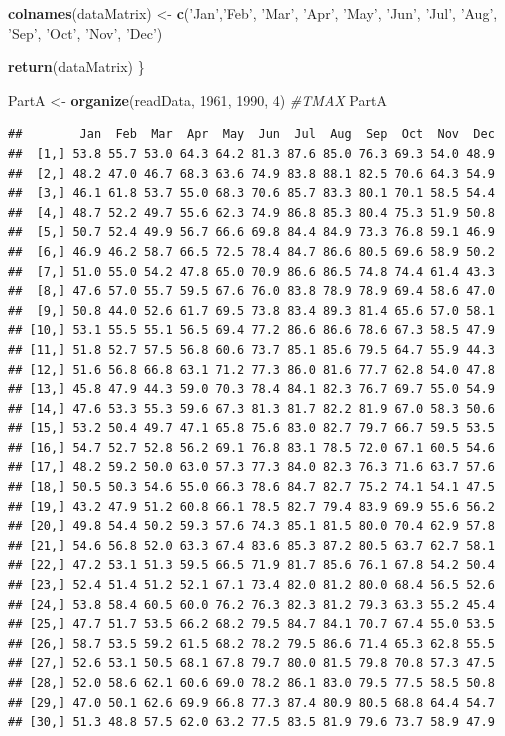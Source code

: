 \documentclass[
]{article}
\newenvironment{Shaded}{\begin{snugshade}}{\end{snugshade}}
\newcommand{\CommentTok}[1]{\textcolor[rgb]{0.56,0.35,0.01}{\textit{#1}}}
\newcommand{\DecValTok}[1]{\textcolor[rgb]{0.00,0.00,0.81}{#1}}
\newcommand{\KeywordTok}[1]{\textcolor[rgb]{0.13,0.29,0.53}{\textbf{#1}}}
\newcommand{\NormalTok}[1]{#1}
\newcommand{\StringTok}[1]{\textcolor[rgb]{0.31,0.60,0.02}{#1}}
\begin{document}
\begin{Shaded}
\begin{Highlighting}[]
  \KeywordTok{colnames}\NormalTok{(dataMatrix) <-}\StringTok{ }\KeywordTok{c}\NormalTok{(}\StringTok{'Jan'}\NormalTok{,}\StringTok{'Feb'}\NormalTok{, }\StringTok{'Mar'}\NormalTok{,}
                           \StringTok{'Apr'}\NormalTok{, }\StringTok{'May'}\NormalTok{, }\StringTok{'Jun'}\NormalTok{,}
                           \StringTok{'Jul'}\NormalTok{, }\StringTok{'Aug'}\NormalTok{, }\StringTok{'Sep'}\NormalTok{,}
                           \StringTok{'Oct'}\NormalTok{, }\StringTok{'Nov'}\NormalTok{, }\StringTok{'Dec'}\NormalTok{)}
  
  
  \KeywordTok{return}\NormalTok{(dataMatrix)}
\NormalTok{\}}


\NormalTok{PartA <-}\StringTok{ }\KeywordTok{organize}\NormalTok{(readData, }\DecValTok{1961}\NormalTok{, }\DecValTok{1990}\NormalTok{, }\DecValTok{4}\NormalTok{) }\CommentTok{#TMAX}
\NormalTok{PartA}
\end{Highlighting}
\end{Shaded}
\newpage
\begin{verbatim}
##        Jan  Feb  Mar  Apr  May  Jun  Jul  Aug  Sep  Oct  Nov  Dec
##  [1,] 53.8 55.7 53.0 64.3 64.2 81.3 87.6 85.0 76.3 69.3 54.0 48.9
##  [2,] 48.2 47.0 46.7 68.3 63.6 74.9 83.8 88.1 82.5 70.6 64.3 54.9
##  [3,] 46.1 61.8 53.7 55.0 68.3 70.6 85.7 83.3 80.1 70.1 58.5 54.4
##  [4,] 48.7 52.2 49.7 55.6 62.3 74.9 86.8 85.3 80.4 75.3 51.9 50.8
##  [5,] 50.7 52.4 49.9 56.7 66.6 69.8 84.4 84.9 73.3 76.8 59.1 46.9
##  [6,] 46.9 46.2 58.7 66.5 72.5 78.4 84.7 86.6 80.5 69.6 58.9 50.2
##  [7,] 51.0 55.0 54.2 47.8 65.0 70.9 86.6 86.5 74.8 74.4 61.4 43.3
##  [8,] 47.6 57.0 55.7 59.5 67.6 76.0 83.8 78.9 78.9 69.4 58.6 47.0
##  [9,] 50.8 44.0 52.6 61.7 69.5 73.8 83.4 89.3 81.4 65.6 57.0 58.1
## [10,] 53.1 55.5 55.1 56.5 69.4 77.2 86.6 86.6 78.6 67.3 58.5 47.9
## [11,] 51.8 52.7 57.5 56.8 60.6 73.7 85.1 85.6 79.5 64.7 55.9 44.3
## [12,] 51.6 56.8 66.8 63.1 71.2 77.3 86.0 81.6 77.7 62.8 54.0 47.8
## [13,] 45.8 47.9 44.3 59.0 70.3 78.4 84.1 82.3 76.7 69.7 55.0 54.9
## [14,] 47.6 53.3 55.3 59.6 67.3 81.3 81.7 82.2 81.9 67.0 58.3 50.6
## [15,] 53.2 50.4 49.7 47.1 65.8 75.6 83.0 82.7 79.7 66.7 59.5 53.5
## [16,] 54.7 52.7 52.8 56.2 69.1 76.8 83.1 78.5 72.0 67.1 60.5 54.6
## [17,] 48.2 59.2 50.0 63.0 57.3 77.3 84.0 82.3 76.3 71.6 63.7 57.6
## [18,] 50.5 50.3 54.6 55.0 66.3 78.6 84.7 82.7 75.2 74.1 54.1 47.5
## [19,] 43.2 47.9 51.2 60.8 66.1 78.5 82.7 79.4 83.9 69.9 55.6 56.2
## [20,] 49.8 54.4 50.2 59.3 57.6 74.3 85.1 81.5 80.0 70.4 62.9 57.8
## [21,] 54.6 56.8 52.0 63.3 67.4 83.6 85.3 87.2 80.5 63.7 62.7 58.1
## [22,] 47.2 53.1 51.3 59.5 66.5 71.9 81.7 85.6 76.1 67.8 54.2 50.4
## [23,] 52.4 51.4 51.2 52.1 67.1 73.4 82.0 81.2 80.0 68.4 56.5 52.6
## [24,] 53.8 58.4 60.5 60.0 76.2 76.3 82.3 81.2 79.3 63.3 55.2 45.4
## [25,] 47.7 51.7 53.5 66.2 68.2 79.5 84.7 84.1 70.7 67.4 55.0 53.5
## [26,] 58.7 53.5 59.2 61.5 68.2 78.2 79.5 86.6 71.4 65.3 62.8 55.5
## [27,] 52.6 53.1 50.5 68.1 67.8 79.7 80.0 81.5 79.8 70.8 57.3 47.5
## [28,] 52.0 58.6 62.1 60.6 69.0 78.2 86.1 83.0 79.5 77.5 58.5 50.8
## [29,] 47.0 50.1 62.6 69.9 66.8 77.3 87.4 80.9 80.5 68.8 64.4 54.7
## [30,] 51.3 48.8 57.5 62.0 63.2 77.5 83.5 81.9 79.6 73.7 58.9 47.9
\end{verbatim}
\end{document}
